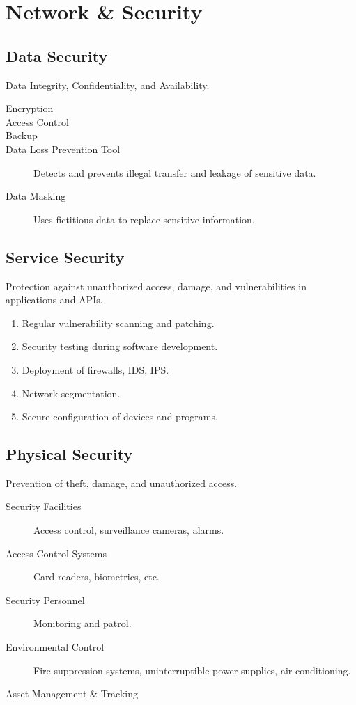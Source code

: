 \documentclass[11pt,journal,compsoc]{IEEEtran}
\begin{document}
\section{Network \& Security}

\subsection{Data Security}

Data Integrity, Confidentiality, and Availability.

\begin{description}
    \item[Encryption]
    \item[Access Control]
    \item[Backup]
    \item[Data Loss Prevention Tool] Detects and prevents illegal transfer and leakage of sensitive data.
    \item[Data Masking] Uses fictitious data to replace sensitive information.
\end{description}

\subsection{Service Security}

Protection against unauthorized access, damage, and vulnerabilities in applications and APIs.

\begin{enumerate}
    \item Regular vulnerability scanning and patching.
    \item Security testing during software development.
    \item Deployment of firewalls, IDS, IPS.
    \item Network segmentation.
    \item Secure configuration of devices and programs.
\end{enumerate}

\subsection{Physical Security}

Prevention of theft, damage, and unauthorized access.

\begin{description}
    \item[Security Facilities] Access control, surveillance cameras, alarms.
    \item[Access Control Systems] Card readers, biometrics, etc.
    \item[Security Personnel] Monitoring and patrol.
    \item[Environmental Control] Fire suppression systems, uninterruptible power supplies, air conditioning.
    \item[Asset Management \& Tracking]
\end{description}
\end{document}
